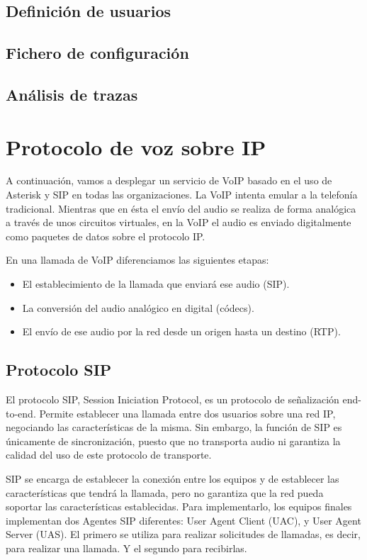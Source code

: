 \documentclass[a4paper]{article}
\begin{document}
\subsection{Definición de usuarios}
\subsection{Fichero de configuración}
\subsection{Análisis de trazas}

\newpage
\section{Protocolo de voz sobre IP}

A continuación, vamos a desplegar un servicio de VoIP basado en el uso de Asterisk y SIP en todas las organizaciones.
La VoIP intenta emular a la telefonía tradicional. Mientras que en ésta el envío del audio se realiza de forma analógica a través de unos circuitos virtuales, en la VoIP el audio es enviado digitalmente como paquetes de datos sobre el protocolo IP.


 En una llamada de VoIP diferenciamos las siguientes etapas:
\begin{itemize}
    \item El establecimiento de la llamada que enviará ese audio (SIP).
    \item La conversión del audio analógico en digital (códecs).
    \item El envío de ese audio por la red desde un origen hasta un destino (RTP).

\end{itemize}

\subsection{Protocolo SIP}
El protocolo SIP, Session Iniciation Protocol, es un protocolo de señalización end-to-end. Permite establecer una llamada entre dos usuarios sobre una red IP, negociando las características de la misma. Sin embargo, la función de SIP es únicamente de sincronización, puesto que no transporta audio ni garantiza la calidad del uso de este protocolo de transporte. 


 SIP se encarga de establecer la conexión entre los equipos y de establecer las características que tendrá la llamada, pero no garantiza que la red pueda soportar las características establecidas.
Para implementarlo, los equipos finales implementan dos Agentes SIP diferentes: User Agent Client (UAC), y User Agent Server (UAS). El primero se utiliza para realizar solicitudes de llamadas, es decir, para realizar una llamada. Y el segundo para recibirlas.
\end{document}
